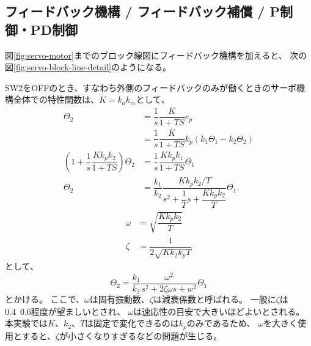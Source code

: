 \documentclass[../../../main]{subfiles}
\begin{document}
\subsection{フィードバック機構 / フィードバック補償 / P制御・PD制御}
図\ref{fig:servo-motor}までのブロック線図にフィードバック機構を加えると、
次の図\ref{fig:servo-block-line-detail}のようになる。


SW2をOFFのとき、すなわち外側のフィードバックのみが働くときのサーボ機構全体での特性関数は、$K=k_a k_m$として、
\begin{align}
    \Theta_2                                                        & = \dfrac{1}{s} \dfrac{K}{1+TS} e_p \nonumber                                                   \\
                                                                    & = \dfrac{1}{s} \dfrac{K}{1+TS} k_p\left( k_1\Theta_1 - k_2 \Theta_2 \right) \nonumber          \\
    \left( 1 + \dfrac{1}{s}\dfrac{K k_p k_2}{1+TS} \right) \Theta_2 & = \dfrac{1}{s} \dfrac{K k_p k_1}{1+TS} \Theta_1 \nonumber                                      \\
    \Theta_2                                                        & = \dfrac{k_1}{k_2} \dfrac{K k_p k_2 / T}{s^2 + \dfrac{1}{T}s +\dfrac{K k_p k_2}{T}} \Theta_1 .
\end{align}
\begin{equation}\label{eq:characteristic-function-parameters}
    \begin{split}
        \omega & = \sqrt{\dfrac{K k_p k_2}{T}}    \\
        \zeta  & = \dfrac{1}{2\sqrt{K k_2 k_p T}}
    \end{split}
\end{equation}
として、
\begin{equation}\label{eq:characteristic-function}
    \Theta_2 = \dfrac{k_1}{k_2} \dfrac{\omega^2}{s^2 + 2\zeta\omega s + w^2} \Theta_1
\end{equation}
とかける。
ここで、$\omega$は固有振動数、$\zeta$は減衰係数と呼ばれる。
一般に$\zeta$は0.4~0.6程度が望ましいとされ、
$\omega$は速応性の目安で大きいほどよいとされる。
本実験では$K$、$k_2$、$T$は固定で変化できるのは$k_p$のみであるため、
$\omega$を大きく使用とすると、$\zeta$が小さくなりすぎるなどの問題が生じる。
\end{document}

